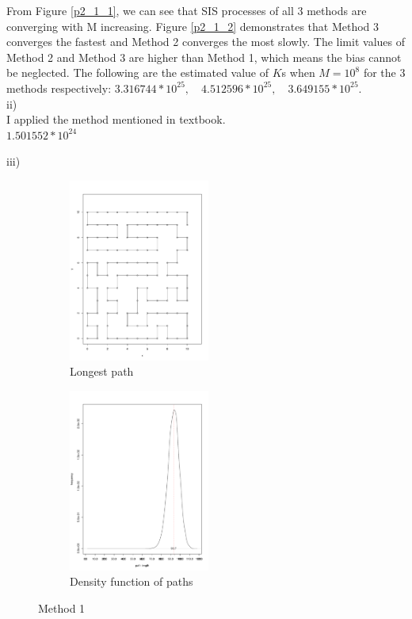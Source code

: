 \documentclass[11pt,english]{article}
\newcommand{\reffig}[1]{Figure \ref{#1}\hspace{2pt}}
\begin{document}
From \reffig{p2_1_1}, we can see that SIS processes of all 3 methods are converging with M increasing. \reffig{p2_1_2} demonstrates that Method 3 converges the fastest and Method 2 converges the most slowly. The limit values of Method 2 and Method 3 are higher than Method 1, which means the bias cannot be neglected. The following are the estimated value of $K$s when $M=10^8$ for the 3 methods respectively: $3.316744 * 10^{25}, \quad  4.512596*10^{25}, \quad 3.649155*10^{25}$.\\



ii)\\
I applied the method mentioned in textbook.\\
$1.501552*10^{24}$

iii)
\begin{figure}[H]
	\centering
	\begin{subfigure}[b]{0.475\textwidth}
		\centering
		\includegraphics[width=\textwidth, height=6cm]{p2_3_1_111.pdf}
		\caption{Longest path}\label{p2_3_1_111}
	\end{subfigure}
	\quad
	\begin{subfigure}[b]{0.475\textwidth}
		\centering
		\includegraphics[width=\textwidth, height=6cm]{p2_3_2.pdf}
		\caption{Density function of paths}\label{p2_3_2}
	\end{subfigure}
	\caption{Method 1}
\end{figure}
\end{document}
